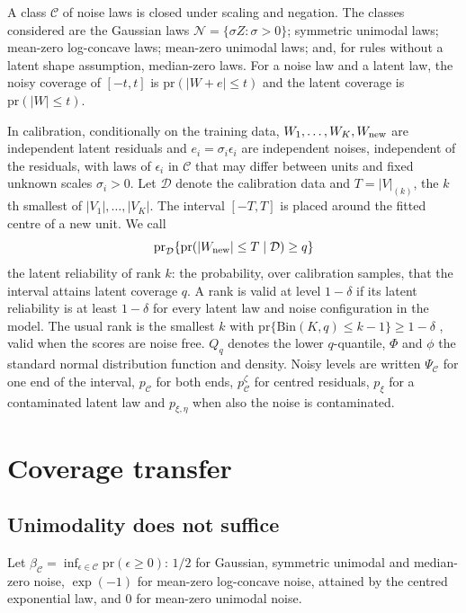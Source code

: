 \documentclass[12pt]{article}
\theoremstyle{definition}
\newcommand{\pr}{\mathrm{pr}}
\newcommand{\E}{\mathcal{C}}
\newcommand{\N}{\mathcal{N}}
\newcommand{\Bin}{\mathrm{Bin}}
\begin{document}
A class $\E$ of noise laws is closed under scaling and negation. The classes considered are the Gaussian laws $\N = \{\sigma Z : \sigma > 0\}$; symmetric unimodal laws; mean-zero log-concave laws; mean-zero unimodal laws; and, for rules without a latent shape assumption, median-zero laws. For a noise law and a latent law, the noisy coverage of $[-t, t]$ is $\pr(|W + e| \le t)$ and the latent coverage is $\pr(|W| \le t)$.

In calibration, conditionally on the training data, $W_1, \ldots, W_K, W_{\rm new}$ are independent latent residuals and $e_i = \sigma_i\epsilon_i$ are independent noises, independent of the residuals, with laws of $\epsilon_i$ in $\E$ that may differ between units and fixed unknown scales $\sigma_i > 0$. Let $\mathcal D$ denote the calibration data and $T = |V|_{(k)}$, the $k$th smallest of $|V_1|, \ldots, |V_K|$. The interval $[-T, T]$ is placed around the fitted centre of a new unit. We call
\[
\pr_{\mathcal D}\{\pr(|W_{\rm new}| \le T \mid \mathcal D) \ge q\}
\]
the latent reliability of rank $k$: the probability, over calibration samples, that the interval attains latent coverage $q$. A rank is valid at level $1 - \delta$ if its latent reliability is at least $1 - \delta$ for every latent law and noise configuration in the model. The usual rank is the smallest $k$ with $\pr\{\Bin(K, q) \le k - 1\} \ge 1 - \delta$ \citep{wilks1941, vovk2012}, valid when the scores are noise free. $Q_q$ denotes the lower $q$-quantile, $\Phi$ and $\phi$ the standard normal distribution function and density. Noisy levels are written $\Psi_{\E}$ for one end of the interval, $p_{\E}$ for both ends, $p^\zeta_{\E}$ for centred residuals, $p_\xi$ for a contaminated latent law and $p_{\xi,\eta}$ when also the noise is contaminated.

\section{Coverage transfer}\label{sec:transfer}

\subsection{Unimodality does not suffice}

Let $\beta_{\E} = \inf_{\epsilon \in \E}\pr(\epsilon \ge 0)$: $1/2$ for Gaussian, symmetric unimodal and median-zero noise, $\exp(-1)$ for mean-zero log-concave noise, attained by the centred exponential law, and $0$ for mean-zero unimodal noise.
\end{document}

